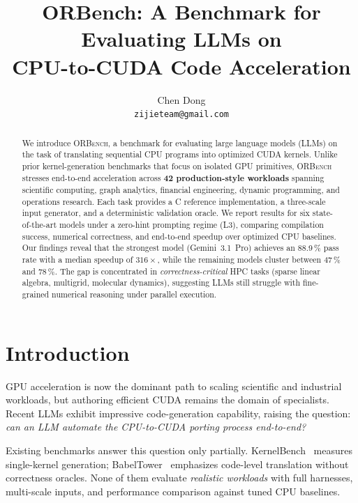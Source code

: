 \documentclass{article}
\title{ORBench: A Benchmark for Evaluating LLMs on \\
       CPU-to-CUDA Code Acceleration}
\author{%
  Chen Dong \\
  \texttt{zijieteam@gmail.com} \\
}
\begin{document}
\maketitle

\begin{abstract}
We introduce \textsc{ORBench}, a benchmark for evaluating large
language models (LLMs) on the task of translating sequential CPU
programs into optimized CUDA kernels. Unlike prior kernel-generation
benchmarks that focus on isolated GPU primitives, \textsc{ORBench}
stresses end-to-end acceleration across \textbf{42 production-style
workloads} spanning scientific computing, graph analytics, financial
engineering, dynamic programming, and operations research. Each task
provides a C reference implementation, a three-scale input generator,
and a deterministic validation oracle. We report results for six
state-of-the-art models under a zero-hint prompting regime (L3),
comparing compilation success, numerical correctness, and end-to-end
speedup over optimized CPU baselines. Our findings reveal that the
strongest model (Gemini~3.1~Pro) achieves an 88.9\,\% pass rate with a
median speedup of $316\times$, while the remaining models cluster
between 47\,\% and 78\,\%. The gap is concentrated in
\emph{correctness-critical} HPC tasks (sparse linear algebra,
multigrid, molecular dynamics), suggesting LLMs still struggle with
fine-grained numerical reasoning under parallel execution.
\end{abstract}

\section{Introduction}
\label{sec:intro}

GPU acceleration is now the dominant path to scaling scientific and
industrial workloads, but authoring efficient CUDA remains the domain
of specialists. Recent LLMs exhibit impressive code-generation
capability, raising the question: \emph{can an LLM automate the
CPU-to-CUDA porting process end-to-end?}

Existing benchmarks answer this question only partially.
KernelBench~\citep{kernelbench} measures single-kernel generation;
BabelTower~\citep{babeltower} emphasizes code-level translation
without correctness oracles. None of them evaluate \emph{realistic
workloads} with full harnesses, multi-scale inputs, and performance
comparison against tuned CPU baselines.
\end{document}
